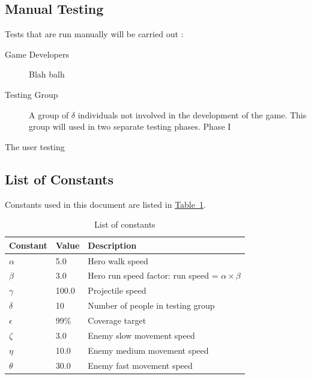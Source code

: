 \documentclass[12pt, titlepage]{article}
\begin{document}
\subsection{Manual Testing}
Tests that are run manually will be carried out :

\begin{description}
  \item[Game Developers] Blah balh
  \item[Testing Group] A group of $\hyperref[tab:constants]{\delta}$ individuals not involved in the development of the game.  This group will used in two separate testing phases.  Phase I 
\end{description}

The user testing


\subsection{List of Constants}
Constants used in this document are listed in \hyperref[tab:constants]{Table~\ref*{tab:constants}}.
\begin{table}[ht]
\caption{List of constants} \label{tab:constants}
\begin{tabularx}{\textwidth}{p{3cm}p{2cm}X}
\toprule {\bf Constant} & {\bf Value} & {\bf Description}\\
\midrule
$\alpha$ & 5.0 & Hero walk speed\\
$\beta$ & 3.0 & Hero run speed factor: run speed = $\alpha \times \beta$\\
$\gamma$ & 100.0 & Projectile speed\\
$\delta$ & 10 & Number of people in testing group\\
$\epsilon$ & 99\% & Coverage target\\
$\zeta$ & 3.0 & Enemy slow movement speed\\
$\eta$ & 10.0 & Enemy medium movement speed\\
$\theta$ & 30.0 & Enemy fast movement speed\\
\bottomrule
\end{tabularx}
\end{table}
\end{document}
